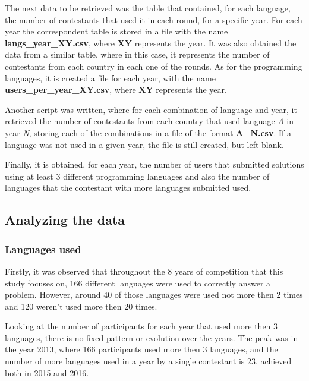 \documentclass{article}
\begin{document}
\begin{multicols*}{2}
The next data to be retrieved was the table that contained, for each language, the number of contestants that used it in each round, for a specific year. For each year the correspondent table is stored in a file with the name \textbf{langs\_year\_XY.csv}, where \textbf{XY} represents the year.
It was also obtained the data from a similar table, where in this case, it represents the number of contestants from each country in each one of the rounds. As for the programming languages, it is created a file for each year, with the name \textbf{users\_per\_year\_XY.csv}, where \textbf{XY} represents the year.

Another script was written, where for each combination of language and year, it retrieved the number of contestants from each country that used language \textit{A} in year \textit{N}, storing each of the combinations in a file of the format \textbf{A\_N.csv}. If a language was not used in a given year, the file is still created, but left blank.

Finally, it is obtained, for each year, the number of users that submitted solutions using at least 3 different programming languages and also the number of languages that the contestant with more languages submitted used.

\subsection{Analyzing the data}

\subsubsection{Languages used}

Firstly, it was observed that throughout the 8 years of competition that this study focuses on, 166 different languages were used to correctly answer a problem. However, around 40 of those languages were used not more then 2 times and 120 weren't used more then 20 times.

Looking at the number of participants for each year that used more then 3 languages, there is no fixed pattern or evolution over the years. The peak was in the year 2013, where 166 participants used more then 3 languages, and the number of more languages used in a year by a single contestant is 23, achieved both in 2015 and 2016.


\end{multicols*}
\end{document}
